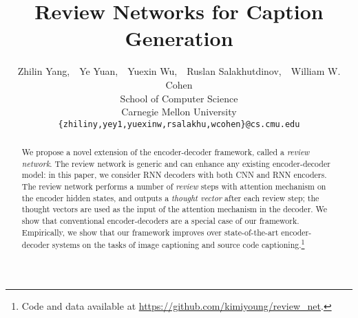 \documentclass{article}
\title{Review Networks for Caption Generation}
\author{
  Zhilin Yang,~~Ye Yuan,~~Yuexin Wu,~~Ruslan Salakhutdinov,~~William W. Cohen \\
  School of Computer Science \\
  Carnegie Mellon University \\
  \texttt{\{zhiliny,yey1,yuexinw,rsalakhu,wcohen\}@cs.cmu.edu}
}
\begin{document}

\maketitle

\begin{abstract}

We propose a novel extension of the encoder-decoder framework, called a \textit{review network}.
The review network is generic and can enhance any existing encoder-decoder model: in this paper, we consider RNN decoders with both CNN and RNN encoders. The review network performs a number of \textit{review} steps with attention mechanism on the encoder hidden states, and outputs a \textit{thought vector} after each review step; the thought vectors are used as the input of the attention mechanism in the decoder. We show that conventional encoder-decoders are a special case of our framework. Empirically, we show that our framework improves over state-of-the-art encoder-decoder systems on the tasks of image captioning and source code captioning.\footnote{Code and data available at \url{https://github.com/kimiyoung/review_net}.}

\end{abstract}
\end{document}
